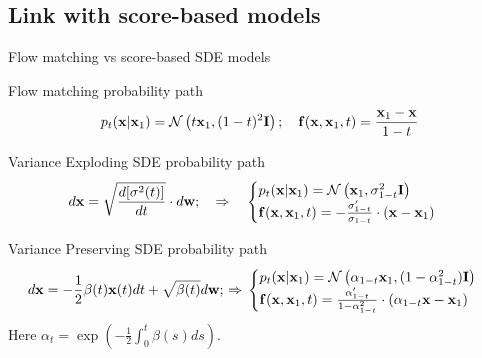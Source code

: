 \subsection{Link with score-based models}
\begin{frame}{Flow matching vs score-based SDE models}
	\begin{block}{Flow matching probability path}
		\vspace{-0.3cm}
		\[
			p_t(\mathbf{x} | \mathbf{x}_1) = \mathcal{N}\left(t \mathbf{x}_1, (1-t)^2 \mathbf{I}\right); \quad \mathbf{f}(\mathbf{x}, \mathbf{x}_1, t) = \frac{\mathbf{x}_1  - \mathbf{x}}{1-t}
		\]
		\vspace{-0.3cm}
	\end{block}
	\begin{block}{Variance Exploding SDE probability path}
		\vspace{-0.3cm}
		\[
			d \mathbf{x} = \sqrt{\frac{ d [\sigma^2(t)]}{dt}} \cdot d \mathbf{w};
			\quad \Rightarrow \quad
			\begin{cases}
				p_t(\mathbf{x} | \mathbf{x}_1) = \mathcal{N}\left(\mathbf{x}_1, \sigma^2_{1-t}  \mathbf{I}\right) \\
				\mathbf{f}(\mathbf{x}, \mathbf{x}_1, t) = - \frac{\sigma'_{1-t}}{\sigma_{1-t}} \cdot (\mathbf{x} - \mathbf{x}_1)
			\end{cases}
		\]
		\vspace{-0.3cm}
	\end{block}
	\begin{block}{Variance Preserving SDE probability path}
		\vspace{-0.3cm}
		{\small
		\[
			d \mathbf{x} = - \frac{1}{2} \beta(t) \mathbf{x}(t) dt + \sqrt{\beta(t)} d \mathbf{w};
			\, \Rightarrow \,
			\begin{cases}
				p_t(\mathbf{x} | \mathbf{x}_1) = \mathcal{N}\left(\alpha_{1-t}  \mathbf{x}_1, (1 - \alpha^2_{1-t})  \mathbf{I} \right) \\
				\mathbf{f}(\mathbf{x}, \mathbf{x}_1, t) = \frac{\alpha'_{1-t}}{1 - \alpha^2_{1-t}}\cdot \left(\alpha_{1-t}  \mathbf{x} - \mathbf{x}_1\right)
			\end{cases}
		\]
		}
		Here $\alpha_t = \exp\left({-\frac{1}{2} \int_0^t \beta(s) ds} \right)$.
	\end{block}
\end{frame}
